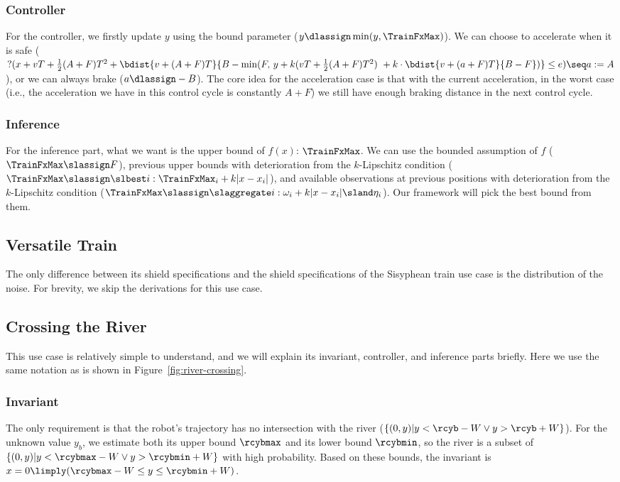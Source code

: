 \subsubsection{Controller}
For the controller, we firstly update $y$ using the bound parameter ($y \dlassign \min(y, \TrainFxMax)$). We can choose to accelerate when it is safe ($?(x + vT + \frac{1}{2}(A + F)T^2 + \bdist{v+(A+F)T}{B - \min(F, \, y + k(vT + \frac{1}{2}(A + F)T^2) \ + k \cdot \bdist{v + (a+F)T}{B-F})} \le e) \seq a := A$), or we can always brake ($a \dlassign -B$). The core idea for the acceleration case is that with the current acceleration, in the worst case (i.e., the acceleration we have in this control cycle is constantly $A+F$) we still have enough braking distance in the next control cycle.

\subsubsection{Inference}
For the inference part, what we want is the upper bound of $f(x)$: $\TrainFxMax$. We can use the bounded assumption of $f$ ($\TrainFxMax \slassign F$), previous upper bounds with deterioration from the $k$-Lipschitz condition ($\TrainFxMax \slassign \slbest i: \TrainFxMax_i + k|x - x_i|$), and available observations at previous positions with deterioration from the $k$-Lipschitz condition ($\TrainFxMax \slassign \slaggregate i: \omega_i + k|x - x_i| \sland \eta_i$). Our framework will pick the best bound from them.

\subsection{Versatile Train}
The only difference between its shield specifications and the shield specifications of the Sisyphean train use case is the distribution of the noise. For brevity, we skip the derivations for this use case.

\subsection{Crossing the River}
This use case is relatively simple to understand, and we will explain its invariant, controller, and inference parts briefly. Here we use the same notation as is shown in Figure~\ref{fig:river-crossing}.

\subsubsection{Invariant}
The only requirement is that the robot's trajectory has no intersection with the river ($\{(0, y) | y < \rcyb - W \lor y > \rcyb + W\}$). For the unknown value $y_b$, we estimate both its upper bound $\rcybmax$ and its lower bound $\rcybmin$, so the river is a subset of $\{(0, y) | y <\rcybmax -W \lor y > \rcybmin + W\}$ with high probability. Based on these bounds, the invariant is $x = 0 \limply (\rcybmax - W \le y \le \rcybmin + W)$.

